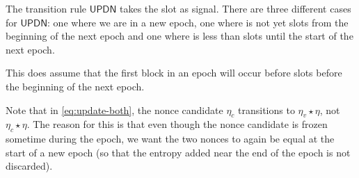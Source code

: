 The transition rule $\mathsf{UPDN}$ takes the slot  as signal. There are
three different cases for $\mathsf{UPDN}$: one where we are in a new epoch, one
where  is not yet \SlotsPrior{} slots from the beginning of the next
epoch and one where  is less than \SlotsPrior{} slots until the start of
the next epoch.

This does assume that the first block in an epoch will occur before
\SlotsPrior{} slots before the beginning of the next epoch.

Note that in \ref{eq:update-both}, the nonce candidate $\eta_c$ transitions to
$\eta_v\star\eta$, not $\eta_c\star\eta$. The reason for this is that even
though the nonce candidate is frozen sometime during the epoch, we want the two
nonces to again be equal at the start of a new epoch (so that the entropy added
near the end of the epoch is not discarded).

